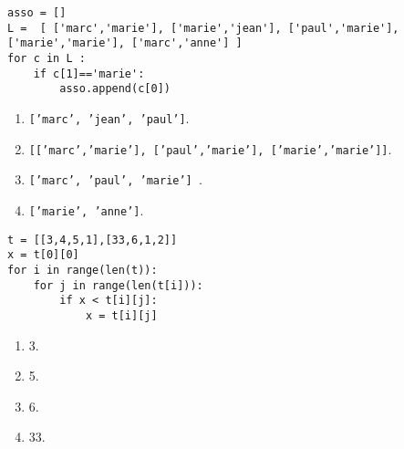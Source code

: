 \documentclass[t,10pt]{article}
\begin{document}
\begin{lstlisting}
asso = []
L =  [ ['marc','marie'], ['marie','jean'], ['paul','marie'], ['marie','marie'], ['marc','anne'] ]
for c in L :
    if c[1]=='marie':
        asso.append(c[0])
\end{lstlisting}
\begin{enumerate}
\item \texttt{['marc', 'jean', 'paul']}.
\item \texttt{[['marc','marie'], ['paul','marie'], ['marie','marie']]}.
\item \texttt{['marc', 'paul', 'marie'] }.%
\item \texttt{['marie', 'anne']}.
\end{enumerate}

\begin{lstlisting}
t = [[3,4,5,1],[33,6,1,2]]
x = t[0][0]
for i in range(len(t)):
    for j in range(len(t[i])):
        if x < t[i][j]:
            x = t[i][j]
\end{lstlisting}
\begin{enumerate}
\item 3.
\item 5.
\item 6.
\item 33. %
\end{enumerate}
\end{document}
